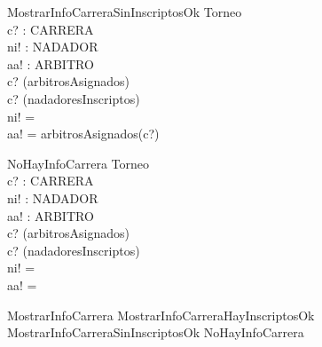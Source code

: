 \begin{schema}{MostrarInfoCarreraSinInscriptosOk}
\Xi Torneo \\
c? : CARRERA \\
ni! : \power NADADOR \\
aa! : \power ARBITRO \\
\where
c? \in \dom(arbitrosAsignados) \\
c? \notin \dom(nadadoresInscriptos) \\
ni! = \emptyset \\
aa! = arbitrosAsignados(c?)
\end{schema}

\begin{schema}{NoHayInfoCarrera}
\Xi Torneo \\
c? : CARRERA \\
ni! : \power NADADOR \\
aa! : \power ARBITRO \\
\where
c? \notin \dom(arbitrosAsignados) \\
c? \notin \dom(nadadoresInscriptos) \\
ni! = \emptyset \\
aa! = \emptyset
\end{schema}

\begin{zed}
MostrarInfoCarrera  MostrarInfoCarreraHayInscriptosOk \lor MostrarInfoCarreraSinInscriptosOk \lor NoHayInfoCarrera
\end{zed}